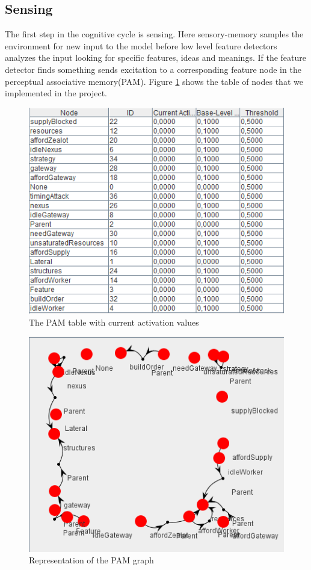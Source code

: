 \subsection{Sensing}
The first step in the cognitive cycle is sensing. Here sensory-memory samples the environment for new input to the model before low level feature detectors analyzes the input looking for specific features, ideas and meanings. If the feature detector finds something sends excitation to a corresponding feature node in the perceptual associative memory(PAM). Figure \ref{fig:pamtable} shows the table of nodes that we implemented in the project. 
\begin{figure}[h!tb]
\centering
\includegraphics[scale=1.0]{graphics/pam_table.png}
\caption{The PAM table with current activation values}
\label{fig:pamtable}
\end{figure}

\begin{figure}[h!tb]
\centering
\includegraphics[scale=1.0]{graphics/pam_graph.png}
\caption{Representation of the PAM graph}
\label{fig:pamgraph}
\end{figure}


